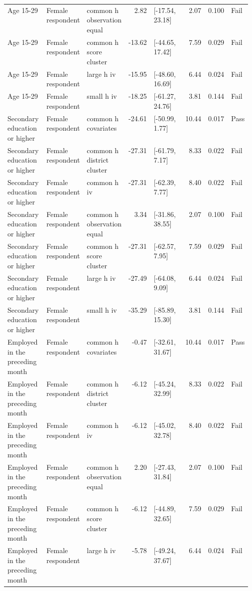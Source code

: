 \begin{longtable}{@{}p{0.16\linewidth}p{0.14\linewidth}p{0.14\linewidth}rp{0.13\linewidth}rrl@{}}
Age 15-29 & Female respondent & common h observation equal & 2.82 & [-17.54, 23.18] & 2.07 & 0.100 & Fail \\
Age 15-29 & Female respondent & common h score cluster & -13.62 & [-44.65, 17.42] & 7.59 & 0.029 & Fail \\
Age 15-29 & Female respondent & large h iv & -15.95 & [-48.60, 16.69] & 6.44 & 0.024 & Fail \\
Age 15-29 & Female respondent & small h iv & -18.25 & [-61.27, 24.76] & 3.81 & 0.144 & Fail \\
Secondary education or higher & Female respondent & common h covariates & -24.61 & [-50.99, 1.77] & 10.44 & 0.017 & Pass \\
Secondary education or higher & Female respondent & common h district cluster & -27.31 & [-61.79, 7.17] & 8.33 & 0.022 & Fail \\
Secondary education or higher & Female respondent & common h iv & -27.31 & [-62.39, 7.77] & 8.40 & 0.022 & Fail \\
Secondary education or higher & Female respondent & common h observation equal & 3.34 & [-31.86, 38.55] & 2.07 & 0.100 & Fail \\
Secondary education or higher & Female respondent & common h score cluster & -27.31 & [-62.57, 7.95] & 7.59 & 0.029 & Fail \\
Secondary education or higher & Female respondent & large h iv & -27.49 & [-64.08, 9.09] & 6.44 & 0.024 & Fail \\
Secondary education or higher & Female respondent & small h iv & -35.29 & [-85.89, 15.30] & 3.81 & 0.144 & Fail \\
Employed in the preceding month & Female respondent & common h covariates & -0.47 & [-32.61, 31.67] & 10.44 & 0.017 & Pass \\
Employed in the preceding month & Female respondent & common h district cluster & -6.12 & [-45.24, 32.99] & 8.33 & 0.022 & Fail \\
Employed in the preceding month & Female respondent & common h iv & -6.12 & [-45.02, 32.78] & 8.40 & 0.022 & Fail \\
Employed in the preceding month & Female respondent & common h observation equal & 2.20 & [-27.43, 31.84] & 2.07 & 0.100 & Fail \\
Employed in the preceding month & Female respondent & common h score cluster & -6.12 & [-44.89, 32.65] & 7.59 & 0.029 & Fail \\
Employed in the preceding month & Female respondent & large h iv & -5.78 & [-49.24, 37.67] & 6.44 & 0.024 & Fail \\

\end{longtable}
